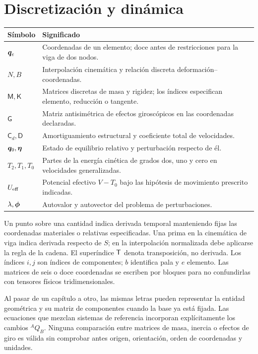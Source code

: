 \section{Discretización y dinámica}
\begin{longtable}{p{}p{}}
\toprule Símbolo & Significado \\\midrule\endhead
$\bm{q}_e$ & Coordenadas de un elemento; doce antes de restricciones para la viga de dos nodos.\\
$N,B$ & Interpolación cinemática y relación discreta deformación--coordenadas.\\
$\mathsf M,\mathsf K$ & Matrices discretas de masa y rigidez; los índices especifican elemento, reducción o tangente.\\
$\mathsf G$ & Matriz antisimétrica de efectos giroscópicos en las coordenadas declaradas.\\
$\mathsf C_d,\mathsf D$ & Amortiguamiento estructural y coeficiente total de velocidades.\\
$\bm{q}_0,\bm{\eta}$ & Estado de equilibrio relativo y perturbación respecto de él.\\
$T_2,T_1,T_0$ & Partes de la energía cinética de grados dos, uno y cero en velocidades generalizadas.\\
$U_{\rm eff}$ & Potencial efectivo $V-T_0$ bajo las hipótesis de movimiento prescrito indicadas.\\
$\lambda,\bm{\phi}$ & Autovalor y autovector del problema de perturbaciones.\\
\bottomrule
\end{longtable}
Un punto sobre una cantidad indica derivada temporal manteniendo fijas las coordenadas materiales o relativas especificadas. Una prima en la cinemática de viga indica derivada respecto de $S$; en la interpolación normalizada debe aplicarse la regla de la cadena. El superíndice $\mathsf T$ denota transposición, no derivada. Los índices $i,j$ son índices de componentes; $b$ identifica pala y $e$ elemento. Las matrices de seis o doce coordenadas se escriben por bloques para no confundirlas con tensores físicos tridimensionales.

Al pasar de un capítulo a otro, las mismas letras pueden representar la entidad geométrica y su matriz de componentes cuando la base ya está fijada. Las ecuaciones que mezclan sistemas de referencia incorporan explícitamente los cambios ${}^AQ_B$. Ninguna comparación entre matrices de masa, inercia o efectos de giro es válida sin comprobar antes origen, orientación, orden de coordenadas y unidades.
\normalsize

